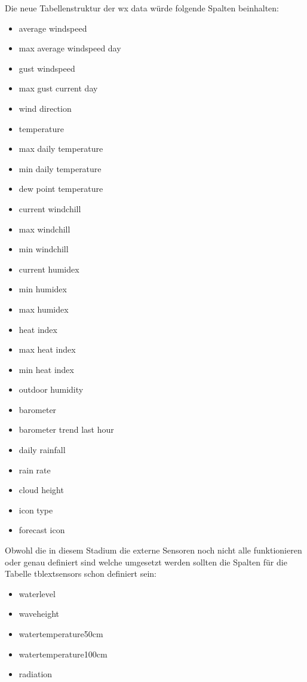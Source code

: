 Die neue Tabellenstruktur der wx data würde folgende Spalten beinhalten:
 \begin{itemize}
\item average windspeed
\item max average windspeed day
\item gust windspeed
\item max gust current day
\item wind direction
\item temperature
\item max daily temperature
\item min daily temperature
\item dew point temperature
\item current windchill
\item max windchill
\item min windchill
\item current humidex
\item min humidex
\item max humidex
\item heat index
\item max heat index
\item min heat index
\item outdoor humidity
\item barometer
\item barometer trend last hour
\item daily rainfall
\item rain rate
\item cloud height
\item icon type
\item forecast icon
\end{itemize}

Obwohl die in diesem Stadium die externe Sensoren noch nicht alle funktionieren oder genau definiert sind welche umgesetzt werden sollten die  Spalten für die Tabelle tblextsensors schon definiert sein:
\begin{itemize}
\item waterlevel
\item waveheight
\item watertemperature50cm
\item watertemperature100cm
\item radiation
\end{itemize}

